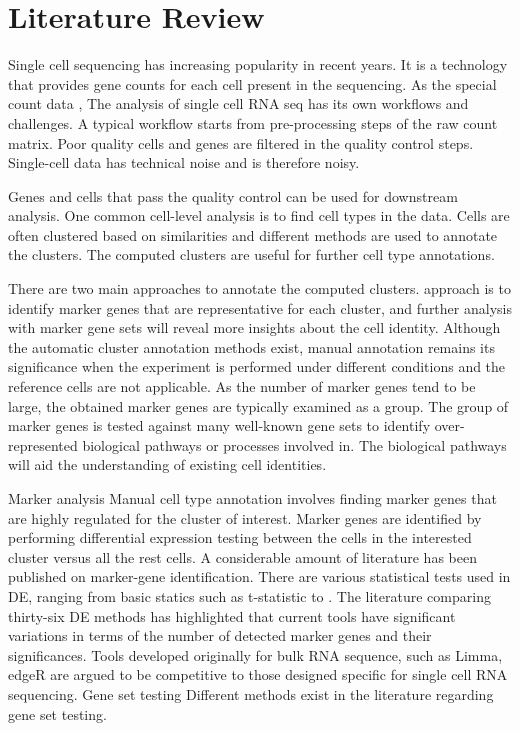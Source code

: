 \chapter{Literature Review}

Single cell sequencing has increasing popularity in recent years. It is a technology that provides gene counts for each cell present in the sequencing. As the special count data ,  
The analysis of single cell RNA seq has its own workflows and challenges. A typical workflow starts from pre-processing steps of the raw count matrix. Poor quality cells and genes are filtered in the quality control steps. 
Single-cell data has technical noise and is therefore noisy. 

Genes and cells that pass the quality control can be used for downstream analysis. 
One common cell-level analysis is to find cell types in the data. Cells are often clustered based on similarities and different methods are used to annotate the clusters. 
The computed clusters are useful for further cell type annotations.

There are two main approaches to annotate the computed clusters. 
approach is to identify marker genes that are representative for each cluster, and further analysis with marker gene sets will reveal more insights about the cell identity. 
Although the automatic cluster annotation methods exist, manual annotation remains its significance when the experiment is performed under different conditions and the reference cells are not applicable. 
As the number of marker genes tend to be large, the obtained marker genes are typically examined as a group. The group of marker genes is tested against many well-known gene sets to identify over-represented biological pathways or processes involved in. The biological pathways will aid the understanding of existing cell identities.  

Marker analysis 
Manual cell type annotation involves finding marker genes that are highly regulated for the cluster of interest. Marker genes are identified by performing differential expression testing between the cells in the interested cluster versus all the rest cells. A considerable amount of literature has been published on marker-gene identification. There are various statistical tests used in DE, ranging from basic statics such as t-statistic to . 
The literature comparing thirty-six DE methods has highlighted that current tools have significant variations in terms of the number of detected marker genes and their significances.  Tools developed originally for bulk RNA sequence, such as Limma, edgeR are argued to be competitive to those designed specific for single cell RNA sequencing. 
Gene set testing 
Different methods exist in the literature regarding gene set testing. 

